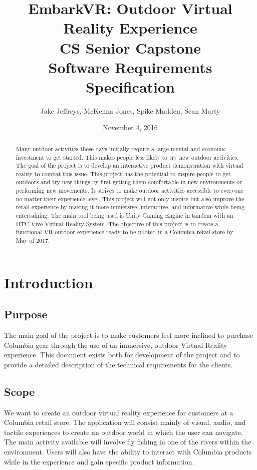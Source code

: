 \documentclass[10pt,journal,compsoc,onecolumn, draftclsnofoot]{IEEEtran}
\title{
EmbarkVR: Outdoor Virtual Reality Experience \\
CS Senior Capstone \\
Software Requirements Specification \\
\vspace{2cm}
}
\author{Jake Jeffreys, McKenna Jones, Spike Madden, Sean Marty}
\date{November 4, 2016}
\begin{document}
\begin{titlepage}
\vspace{3cm}
\maketitle
\vspace{3cm}
\begin{abstract}
Many outdoor activities these days initially require a large mental and economic
investment to get started. This makes people less likely to try new outdoor
activities. The goal of the project is to develop an interactive product
demonstration with virtual reality to combat this issue. This project has the
potential to inspire people to get outdoors and try new things by first getting
them comfortable in new environments or performing new movements. It strives to
make outdoor activities accessible to everyone no matter their experience level.
This project will not only inspire but also improve the retail experience by
making it more immersive, interactive, and informative while being
entertaining. The main tool being used is Unity Gaming Engine in tandem with an
HTC Vive Virtual Reality System. The objective of this project is to create a
functional VR outdoor experience ready to be piloted in a Columbia retail store
by May of 2017.
\end{abstract}

\end{titlepage}

\tableofcontents
\clearpage
\section{Introduction}

\subsection{Purpose}
The main goal of the project is to make customers feel more inclined to purchase
Columbia gear through the use of an immersive, outdoor Virtual Reality
experience. This document exists both for development of the project and to provide a detailed description of the technical requirements for the clients.

\subsection{Scope}
We want to create an outdoor virtual reality experience for customers at a
Columbia retail store. The application will consist mainly of visual, audio, and tactile
experiences to create an outdoor world in which the user can navigate. The main
activity available will involve fly fishing in one of the rivers within the
environment. Users will also have the ability to interact with Columbia products
while in the experience and gain specific product information.
\end{document}
